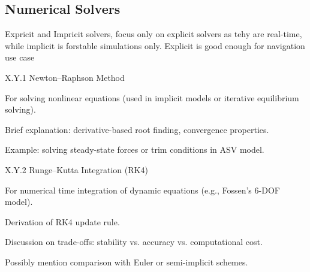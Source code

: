 \subsection{Numerical Solvers}
Expricit and Impricit solvers, focus only on explicit solvers as tehy are real-time, while implicit is forstable  simulations only. Explicit is good enough for navigation use case

X.Y.1 Newton–Raphson Method

For solving nonlinear equations (used in implicit models or iterative equilibrium solving).

Brief explanation: derivative-based root finding, convergence properties.

Example: solving steady-state forces or trim conditions in ASV model.

X.Y.2 Runge–Kutta Integration (RK4)

For numerical time integration of dynamic equations (e.g., Fossen’s 6-DOF model).

Derivation of RK4 update rule.

Discussion on trade-offs: stability vs. accuracy vs. computational cost.

Possibly mention comparison with Euler or semi-implicit schemes.
